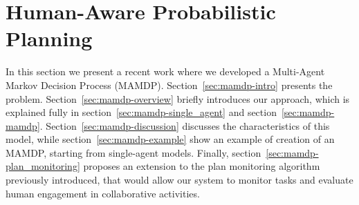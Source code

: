 \chapter{Human-Aware Probabilistic Planning}
\label{chapter:mamdp}


In this section we present a recent work where we developed a Multi-Agent Markov Decision Process (MAMDP). Section~\ref{sec:mamdp-intro} presents the problem. Section~\ref{sec:mamdp-overview} briefly introduces our approach, which is explained fully in section~\ref{sec:mamdp-single_agent} and section~\ref{sec:mamdp-mamdp}. Section~\ref{sec:mamdp-discussion} discusses the characteristics of this model, while section~\ref{sec:mamdp-example} show an example of creation of an MAMDP, starting from single-agent models. Finally, section~\ref{sec:mamdp-plan_monitoring} proposes an extension to the plan monitoring algorithm previously introduced, that would allow our system to monitor tasks and evaluate human engagement in collaborative activities.


